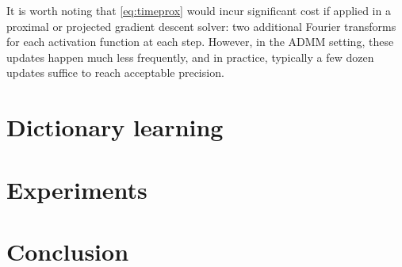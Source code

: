 \documentclass{article} %
\begin{document}
It is worth noting that \eqref{eq:timeprox} would incur significant cost if applied 
in a proximal or projected gradient descent solver: two additional Fourier transforms 
for each activation function at each step.  However, in the ADMM setting, these updates 
happen much less frequently, and in practice, typically a few dozen updates suffice to 
reach acceptable precision.


\section{Dictionary learning}

\section{Experiments}
\section{Conclusion}



\end{document}

